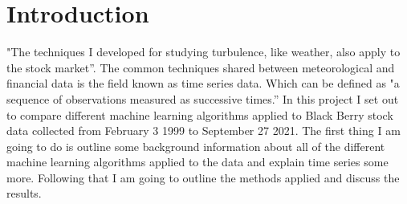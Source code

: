 \chapter{Introduction} "The techniques I developed for studying turbulence, like weather, also apply to the stock market''.\cite{Mandlebrot} The common techniques shared between meteorological and financial data is the field known as time series data. Which can be defined as "a sequence of observations measured as successive times.''\cite{TimeSeriesDefinition} In this project I set out to compare different machine learning algorithms applied to Black Berry stock data collected from February 3 1999 to September 27 2021. The first thing I am going to do is outline some background information about all of the different machine learning algorithms applied to the data and explain time series some more. Following that I am going to outline the methods applied and discuss the results.